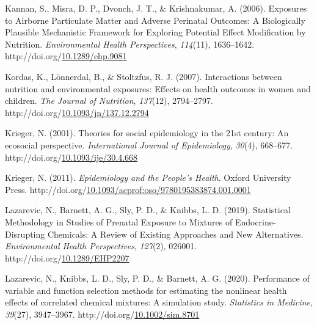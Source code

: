 \documentclass[12pt, twoside]{amherstthesis}
\newenvironment{CSLReferences}[2]%
  {}%
  {\par}
\begin{document}
\begin{CSLReferences}{1}{0}
\leavevmode{}%
Kannan, S., Misra, D. P., Dvonch, J. T., \& Krishnakumar, A. (2006). Exposures to {Airborne} {Particulate} {Matter} and {Adverse} {Perinatal} {Outcomes}: {A} {Biologically} {Plausible} {Mechanistic} {Framework} for {Exploring} {Potential} {Effect} {Modification} by {Nutrition}. \emph{Environmental Health Perspectives}, \emph{114}(11), 1636--1642. http://doi.org/\href{https://doi.org/10.1289/ehp.9081}{10.1289/ehp.9081}

\leavevmode{}%
Kordas, K., Lönnerdal, B., \& Stoltzfus, R. J. (2007). Interactions between nutrition and environmental exposures: Effects on health outcomes in women and children. \emph{The Journal of Nutrition}, \emph{137}(12), 2794--2797. http://doi.org/\href{https://doi.org/10.1093/jn/137.12.2794}{10.1093/jn/137.12.2794}

\leavevmode{}%
Krieger, N. (2001). Theories for social epidemiology in the 21st century: An ecosocial perspective. \emph{International Journal of Epidemiology}, \emph{30}(4), 668--677. http://doi.org/\href{https://doi.org/10.1093/ije/30.4.668}{10.1093/ije/30.4.668}

\leavevmode{}%
Krieger, N. (2011). \emph{Epidemiology and the {People}'s {Health}}. Oxford University Press. http://doi.org/\href{https://doi.org/10.1093/acprof:oso/9780195383874.001.0001}{10.1093/acprof:oso/9780195383874.001.0001}

\leavevmode{}%
Lazarevic, N., Barnett, A. G., Sly, P. D., \& Knibbs, L. D. (2019). Statistical {Methodology} in {Studies} of {Prenatal} {Exposure} to {Mixtures} of {Endocrine}-{Disrupting} {Chemicals}: {A} {Review} of {Existing} {Approaches} and {New} {Alternatives}. \emph{Environmental Health Perspectives}, \emph{127}(2), 026001. http://doi.org/\href{https://doi.org/10.1289/EHP2207}{10.1289/EHP2207}

\leavevmode{}%
Lazarevic, N., Knibbs, L. D., Sly, P. D., \& Barnett, A. G. (2020). Performance of variable and function selection methods for estimating the nonlinear health effects of correlated chemical mixtures: {A} simulation study. \emph{Statistics in Medicine}, \emph{39}(27), 3947--3967. http://doi.org/\href{https://doi.org/10.1002/sim.8701}{10.1002/sim.8701}


\end{CSLReferences}
\end{document}

